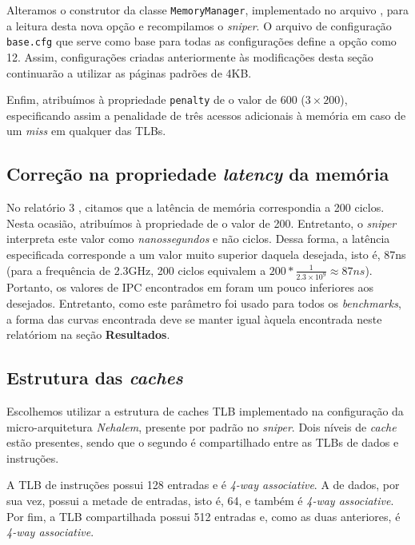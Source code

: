 \documentclass[12pt]{article}
\begin{document}
Alteramos o construtor da classe \texttt{MemoryManager}, implementado
no arquivo , para a leitura desta nova opção e
recompilamos o \textit{sniper}. O arquivo de configuração \texttt{base.cfg} que
serve como base para todas as configurações define a opção 
como 12. Assim, configurações criadas anteriormente às modificações desta
seção continuarão a utilizar as páginas padrões de 4KB.

Enfim, atribuímos à propriedade \texttt{penalty} de  o
valor de 600 (\(3\times 200\)), especificando assim a penalidade de três acessos
adicionais à memória em caso de um \textit{miss} em qualquer das TLBs.

\subsection{Correção na propriedade \textit{latency} da memória}

No relatório 3 \cite{relatorio3}, citamos que a latência de memória
correspondia a 200 ciclos. Nesta ocasião, atribuímos à propriedade
 de  o valor de 200. Entretanto, o
\textit{sniper} interpreta este valor como \textit{nanossegundos} e não ciclos.
Dessa forma, a latência especificada corresponde a um valor muito superior
daquela desejada, isto é, 87ns (para a frequência de 2.3GHz, 200 ciclos
equivalem a \(200*\frac{1}{2.3\times 10^9} \approx 87ns\)). Portanto, os valores
de IPC encontrados em \cite{relatorio3} foram um pouco inferiores aos desejados.
Entretanto, como este parâmetro foi usado para todos os \textit{benchmarks}, a
forma das curvas encontrada deve se manter igual àquela encontrada neste
relatóriom na seção \textbf{Resultados}.

\subsection{Estrutura das \textit{caches}}

Escolhemos utilizar a estrutura de caches TLB implementado na configuração da
micro-arquitetura \textit{Nehalem}, presente por padrão no \textit{sniper}. Dois
níveis de \textit{cache} estão presentes, sendo que o segundo é compartilhado
entre as TLBs de dados e instruções. 

A TLB de instruções possui 128 entradas e é \textit{4-way associative}. A de
dados, por sua vez, possui a metade de entradas, isto é, 64, e também é
\textit{4-way associative}. Por fim, a TLB compartilhada possui 512 entradas e,
como as duas anteriores, é \textit{4-way associative}. 
\end{document}
